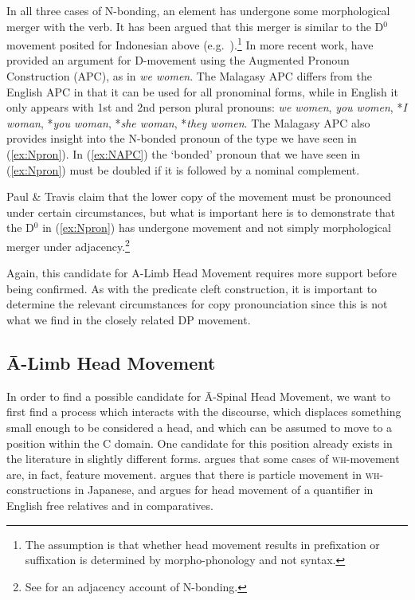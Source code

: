 \documentclass[output=paper,colorlinks,citecolor=brown,
]{langscibook}
\begin{document}
In all three cases of N-bonding, an element has undergone some morphological merger with the verb. It has been argued that this merger is similar to the D$^0$ movement posited for Indonesian above (e.g.\ \citealt{Travis:2006}).\footnote{The assumption is that whether head movement results in prefixation or suffixation is determined by morpho-phonology and not syntax.}  In more recent work, \citet{Paul:2019} have provided an argument for D-movement using the Augmented Pronoun Construction (APC), as in \textit{we women}.  The Malagasy APC differs from the English APC in that it can be used for all pronominal forms, while in English it only appears with 1st and 2nd person plural pronouns: \textit{we women}, \textit{you women}, *\textit{I woman}, *\textit{you woman}, *\textit{she woman}, *\textit{they women}.  The Malagasy APC also provides insight into the N-bonded pronoun of the type we have seen in (\ref{ex:Npron}).  In (\ref{ex:NAPC}) the 	`bonded' pronoun that we have seen in (\ref{ex:Npron}) must be doubled if it is followed by a nominal complement.

\z

Paul \& Travis claim that the lower copy of the movement must be pronounced under certain circumstances, but what is important here is to demonstrate that the D$^0$ in (\ref{ex:Npron}) has undergone movement and not simply morphological merger under adjacency.\footnote{See \citet{Levin:2015} for an adjacency account of N-bonding.}

Again, this candidate for A-Limb Head Movement requires more support before being confirmed. As with the predicate cleft construction, it is important to determine the relevant circumstances for copy pronounciation since this is not what we find in the closely related DP movement.

\subsection{\=A-Limb Head Movement}

In order to find a possible candidate for \=A-Spinal Head Movement, we want to first find a process which interacts with the discourse, which displaces something small enough to be considered a head, and which can be assumed to move to a position within the C domain.  One candidate for this position already exists in the literature in slightly different forms.  \citet{Cheng:2000b} argues that some cases of \textsc{wh}-movement are, in fact,  feature movement.  \citet{Hagstrom:2000,Hagstrom:2004} argues that there is particle movement in \textsc{wh}-constructions in Japanese,  and \citet{Donati:2006} argues for head movement of a quantifier in English free relatives and in comparatives.  
\end{document}
